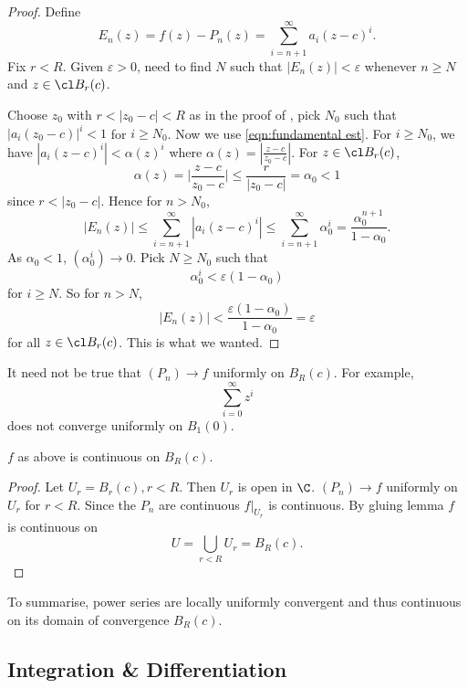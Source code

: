 \documentclass[a4paper]{article}
\theoremstyle{definition}
\begin{document}
\begin{proof}
  Define
  \[
    E_n(z) = f(z) - P_n(z) = \sum_{i=n+1}^{\infty}a_i(z-c)^i. 
  \]
  Fix \(r< R\). Given \(\varepsilon>0\), need to find \(N \) such that \(|E_n(z)| < \varepsilon\) whenever \(n\geq N\) and \(z\in \cl B_r(c)\).

  Choose \(z_0\) with \(r< |z_0-c| < R\) as in the proof of , pick \(N_0\) such that \(|a_i(z_0-c)|^i<1\) for \(i\geq N_0\). Now we use \ref{eqn:fundamental est}. For \(i\geq N_0\), we have \(|a_i(z-c)^i| < \alpha(z)^i\) where \(\alpha(z) = |\frac{z-c}{z_0-c}|\). For \(z\in \cl B_r(c)\),
  \[
    \alpha(z) = \Big| \frac{z-c}{z_0-c} \Big| \leq \frac{r}{|z_0-c|} = \alpha_0 < 1
  \]
  since \(r < |z_0-c|\). Hence for \(n>N_0\),
  \[
    |E_n(z)| \leq \sum_{i=n+1}^{\infty}|a_i(z-c)^i| \leq \sum_{i=n+1}^{\infty}\alpha_0^i = \frac{\alpha_0^{n+1}}{1-\alpha_0}.
  \]
  As \(\alpha_0 < 1\), \((\alpha_0^i)\to 0\). Pick \(N\geq N_0\) such that
  \[
\alpha_0^i < \varepsilon (1-\alpha_0)
  \]
  for \(i\geq N\). So for \(n>N\),
  \[
    |E_n(z)| < \frac{\varepsilon (1-\alpha_0)}{1-\alpha_0} = \varepsilon
  \]
  for all \(z\in \cl B_r(c)\).
  This is what we wanted.
\end{proof}

\begin{note}
  It need not be true that \((P_n)\to f\) uniformly on \(B_R(c)\). For example,
  \[
    \sum_{i=0}^{\infty}z^i
  \]
  does not converge uniformly on \(B_1(0)\).
\end{note}

\begin{corollary}
  \(f\) as above is continuous on \(B_R(c)\).
\end{corollary}

\begin{proof}
  Let \(U_r = B_r(c), r<R\). Then \(U_r\) is open in \(\C\). \((P_n)\to f\) uniformly on \(U_r\) for \(r< R\). Since the \(P_n\) are continuous \(f|_{U_r}\) is continuous. By gluing lemma \(f\) is continuous on
  \[
    U = \bigcup_{r<R} U_r = B_R(c).
  \]
\end{proof}

To summarise, power series are locally uniformly convergent and thus continuous on its domain of convergence \(B_R(c)\).

\subsection{Integration \& Differentiation}
\end{document}
